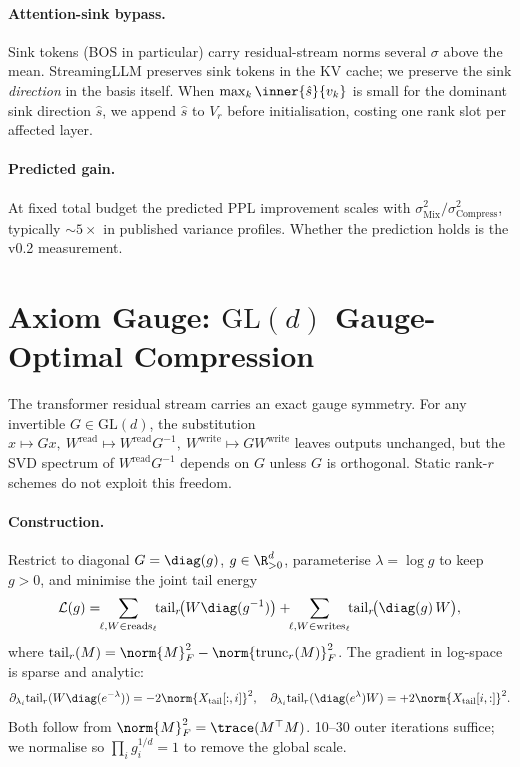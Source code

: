\documentclass[11pt]{article}
\begin{document}
\paragraph{Attention-sink bypass.}  Sink tokens (BOS in particular) carry
residual-stream norms several $\sigma$ above the mean.  StreamingLLM
\cite{xiao2023streamingllm} preserves sink tokens in the KV cache; we
preserve the sink \emph{direction} in the basis itself.  When
$\max_k\inner{\hat s}{v_k}$ is small for the dominant sink direction
$\hat s$, we append $\hat s$ to $V_r$ before initialisation, costing one
rank slot per affected layer.

\paragraph{Predicted gain.}  At fixed total budget the predicted PPL
improvement scales with $\sigma^2_\text{Mix}/\sigma^2_\text{Compress}$,
typically $\sim 5\times$ in published variance profiles.  Whether the
prediction holds is the v0.2 measurement.

\section{Axiom Gauge: $\mathrm{GL}(d)$ Gauge-Optimal Compression}
\label{sec:gauge}
The transformer residual stream carries an exact gauge symmetry.  For any
invertible $G\in\mathrm{GL}(d)$, the substitution
$x\!\mapsto\!Gx,\ W^\text{read}\!\mapsto\!W^\text{read}G^{-1},\
W^\text{write}\!\mapsto\!GW^\text{write}$ leaves outputs unchanged, but
the SVD spectrum of $W^\text{read}G^{-1}$ depends on $G$ unless $G$ is
orthogonal.  Static rank-$r$ schemes do not exploit this freedom.

\paragraph{Construction.}  Restrict to diagonal $G=\diag(g)$, $g\in\R^d_{>0}$,
parameterise $\lambda=\log g$ to keep $g>0$, and minimise the joint tail
energy
\[
\mathcal{L}(g)=\!\!\sum_{\ell,W\in\text{reads}_\ell}\!\!\mathrm{tail}_r\!\bigl(W\diag(g^{-1})\bigr)
+\!\!\sum_{\ell,W\in\text{writes}_\ell}\!\!\mathrm{tail}_r\!\bigl(\diag(g)\,W\bigr),
\]
where $\mathrm{tail}_r(M)=\norm{M}_F^2-\norm{\mathrm{trunc}_r(M)}_F^2$.  The
gradient in log-space is sparse and analytic:
\[
\partial_{\lambda_i}\mathrm{tail}_r(W\diag(e^{-\lambda}))=-2\norm{X_\text{tail}[:,i]}^2,\quad
\partial_{\lambda_i}\mathrm{tail}_r(\diag(e^{\lambda})W)=+2\norm{X_\text{tail}[i,:]}^2.
\]
Both follow from $\norm{M}_F^2=\trace(M^\top M)$.  10--30 outer iterations
suffice; we normalise so $\prod_i g_i^{1/d}=1$ to remove the global scale.
\end{document}
